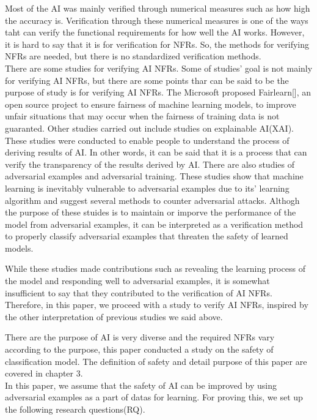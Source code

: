 \documentclass[journal,article,submit,moreauthors,pdftex]{Definitions/mdpi}
\begin{document}
Most of the AI was mainly verified through numerical measures such as how high the accuracy is. 
Verification through these numerical measures is one of the ways taht can verify the functional requirements for how well the AI works.
However, it is hard to say that it is for verification for NFRs.
So, the methods for verifying NFRs are needed, but there is no standardized verification methods.\\

There are some studies for verifying AI NFRs. Some of studies' goal is not mainly for verifying AI NFRs, but there are some points thar can be said to be the purpose of study is for verifying AI NFRs.
The Microsoft proposed Fairlearn[], an open source project to ensure fairness of machine learning models, to improve unfair situations that may occur when the fairness of training data is not guaranted.
Other studies carried out include studies on explainable AI(XAI). These studies were conducted to enable people to understand the process of deriving results of AI. In other words, it can be said that it is a process that can verify the transparency of the results derived by AI.
There are also studies of adversarial examples and adversarial training. These studies show that machine learning is inevitably vulnerable to adversarial examples due to its' learning algorithm and suggest several methods to counter adversarial attacks. Althogh the purpose of these stuides is to maintain or imporve the performance of the model from adversarial examples, it can be interpreted as a verification method to properly classify adversarial examples that threaten the safety of learned models.

While these studies made contributions such as revealing the learning process of the model and responding well to adversarial examples, it is somewhat insufficient to say that they contributed to the verification of AI NFRs.
Therefore, in this paper, we proceed with a study to verify AI NFRs, inspired by the other interpretation of previous studies we said above.

There are the purpose of AI is very diverse and the required NFRs vary according to the purpose, this paper conducted a study on the safety of classification model. The definition of safety and detail purpose of this paper are covered in chapter 3. \\

In this paper, we assume that the safety of AI can be improved by using adversarial examples as a part of datas for learning. For proving this, we set up the following research questions(RQ). \\
\end{document}
